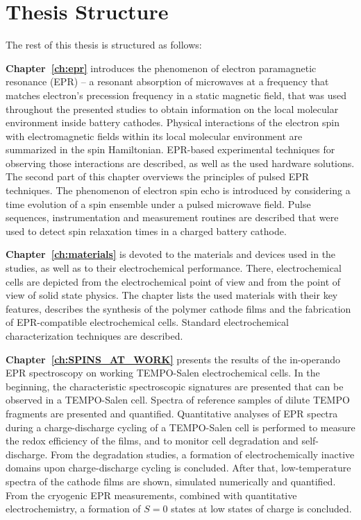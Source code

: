 \section{Thesis Structure}

The rest of this thesis is structured as follows:\\ 
\par
\textbf{Chapter~\ref{ch:epr}} introduces the phenomenon of electron paramagnetic resonance (EPR) -- a resonant absorption of microwaves at a frequency that matches electron's precession frequency in a static magnetic field, that was used throughout the presented studies to obtain information on the local molecular environment inside battery cathodes. Physical interactions of the electron spin with electromagnetic fields within its local molecular environment are summarized in the spin Hamiltonian. EPR-based experimental techniques for observing those interactions are described, as well as the used hardware solutions. The second part of this chapter overviews the principles of pulsed EPR techniques. The phenomenon of electron spin echo is introduced by considering a time evolution of a spin ensemble under a pulsed microwave field. Pulse sequences, instrumentation and measurement routines are described that were used to detect spin relaxation times in a charged battery cathode.\\

\par
\textbf{Chapter~\ref{ch:materials}} is devoted to the materials and devices used in the studies, as well as to their electrochemical performance. There, electrochemical cells are depicted from the electrochemical point of view and from the point of view of solid state physics. The chapter lists the used materials with their key features, describes the synthesis of the polymer cathode films and the fabrication of EPR-compatible electrochemical cells. Standard electrochemical characterization techniques are described.\\

\par
\textbf{Chapter~\ref{ch:SPINS_AT_WORK}} presents the results of the in-operando EPR spectroscopy on working TEMPO-Salen electrochemical cells. In the beginning, the characteristic spectroscopic signatures are presented that can be observed in a TEMPO-Salen cell. Spectra of reference samples of dilute TEMPO fragments are presented and quantified. Quantitative analyses of EPR spectra during a charge-discharge cycling of a TEMPO-Salen cell is performed to measure the redox efficiency of the films, and to monitor cell degradation and self-discharge. From the degradation studies, a formation of electrochemically inactive domains upon charge-discharge cycling is concluded. After that, low-temperature spectra of the cathode films are shown, simulated numerically and quantified. From the cryogenic EPR measurements, combined with quantitative electrochemistry, a formation of $S=0$ states at low states of charge is concluded.\\ 

